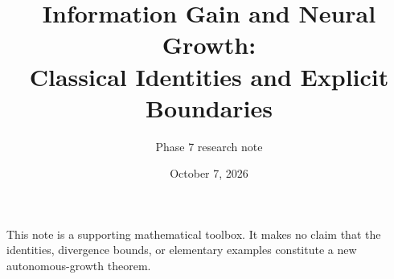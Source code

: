 \documentclass[11pt]{article}
\title{Information Gain and Neural Growth:\\Classical Identities and Explicit Boundaries}
\author{Phase 7 research note}
\date{October 7, 2026}
\theoremstyle{remark}\newtheorem{remark}[proposition]{Remark}
\begin{document}
\maketitle
\noindent This note is a supporting mathematical toolbox. It makes no
claim that the identities, divergence bounds, or elementary examples
constitute a new autonomous-growth theorem.



\end{document}
